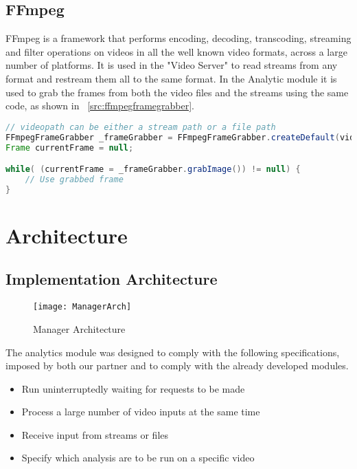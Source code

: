 \subsection{FFmpeg}
FFmpeg is a framework that performs encoding, decoding, transcoding, streaming and filter operations on videos in all the well known video formats, across a large number of platforms. It is used in the "Video Server" to read streams from any format and restream them all to the same format. In the Analytic module it is used to grab the frames from both the video files and the streams using the same code, as shown in ~\ref{src:ffmpegframegrabber}.

\begin{lstlisting}[float,language=Java, label={src:ffmpegframegrabber}, caption=FFmpegFrameGrabber usage example] 
// videopath can be either a stream path or a file path
FFmpegFrameGrabber _frameGrabber = FFmpegFrameGrabber.createDefault(videopath);
Frame currentFrame = null;

while( (currentFrame = _frameGrabber.grabImage()) != null) {
	// Use grabbed frame
}
\end{lstlisting}

\section{Architecture}

\subsection{Implementation Architecture}

\begin{figure}[h]
  \begin{center}
    \leavevmode
    \texttt{[image: ManagerArch]}
    \caption{Manager Architecture}
    \label{fig:manager_arch}
  \end{center}
\end{figure}


The analytics module was designed to comply with the following specifications, imposed by both our partner and to comply with the already developed modules. 

\begin{itemize}
	\item Run uninterruptedly waiting for requests to be made
	\item Process a large number of video inputs at the same time
	\item Receive input from streams or files
	\item Specify which analysis are to be run on a specific video
\end{itemize}

